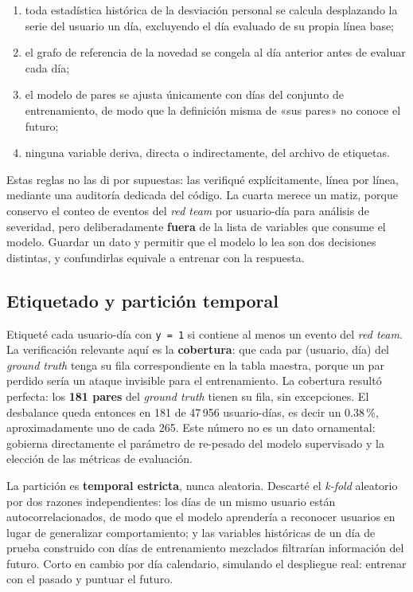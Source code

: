 \documentclass[12pt, a4paper]{article}
\begin{document}
\begin{enumerate}[leftmargin=1.2cm, itemsep=2pt]
  \item toda estadística histórica de la desviación personal se calcula desplazando la serie del
        usuario un día, excluyendo el día evaluado de su propia línea base;
  \item el grafo de referencia de la novedad se congela al día anterior antes de evaluar cada día;
  \item el modelo de pares se ajusta únicamente con días del conjunto de entrenamiento, de modo que
        la definición misma de «sus pares» no conoce el futuro;
  \item ninguna variable deriva, directa o indirectamente, del archivo de etiquetas.
\end{enumerate}

Estas reglas no las di por supuestas: las verifiqué explícitamente, línea por línea, mediante una
auditoría dedicada del código. La cuarta merece un matiz, porque conservo el conteo de eventos del
\textit{red team} por usuario-día para análisis de severidad, pero deliberadamente \textbf{fuera} de
la lista de variables que consume el modelo. Guardar un dato y permitir que el modelo lo lea son dos
decisiones distintas, y confundirlas equivale a entrenar con la respuesta.

\subsection{Etiquetado y partición temporal}

Etiqueté cada usuario-día con \texttt{y = 1} si contiene al menos un evento del \textit{red team}.
La verificación relevante aquí es la \textbf{cobertura}: que cada par (usuario, día) del
\textit{ground truth} tenga su fila correspondiente en la tabla maestra, porque un par perdido sería
un ataque invisible para el entrenamiento. La cobertura resultó perfecta: los \textbf{181 pares} del
\textit{ground truth} tienen su fila, sin excepciones. El desbalance queda entonces en 181 de
47\,956 usuario-días, es decir un 0.38\,\%, aproximadamente uno de cada 265. Este número no es un
dato ornamental: gobierna directamente el parámetro de re-pesado del modelo supervisado y la elección
de las métricas de evaluación.

La partición es \textbf{temporal estricta}, nunca aleatoria. Descarté el \textit{k-fold} aleatorio
por dos razones independientes: los días de un mismo usuario están autocorrelacionados, de modo que
el modelo aprendería a reconocer usuarios en lugar de generalizar comportamiento; y las variables
históricas de un día de prueba construido con días de entrenamiento mezclados filtrarían información
del futuro. Corto en cambio por día calendario, simulando el despliegue real: entrenar con el pasado
y puntuar el futuro.
\end{document}
